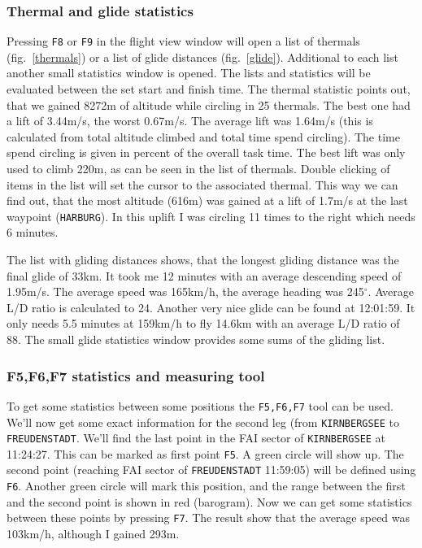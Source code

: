 \subsubsection{Thermal and glide statistics}
Pressing \texttt{F8} or \texttt{F9} in the flight view window will open a list of thermals (fig.~\ref{thermals}) or a list of glide distances (fig.~\ref{glide}).
Additional to each list another small statistics window is opened. The lists and statistics will be evaluated between the set start and finish time.
The thermal statistic points out, that we gained 8272m of altitude while circling in 25 thermals. The best one had a lift of 3.44m/s, the worst 0.67m/s.
The average lift was 1.64m/s (this is calculated from total altitude climbed and total time spend circling).
The time spend circling is given in percent of the overall task time. The best lift was only used to climb 220m, as can be seen in the list of thermals.
Double clicking of items in the list will set the cursor to the associated thermal.
This way we can find out, that the most altitude (616m) was gained at a lift of 1.7m/s at the last waypoint (\texttt{HARBURG}).
In this uplift I was circling 11 times to the right which needs 6 minutes.

The list with gliding distances shows, that the longest gliding distance was the final glide of 33km.
It took me 12 minutes with an average descending speed of 1.95m/s. The average speed was 165km/h, the average heading was 245$^\circ$.
Average L/D ratio is calculated to 24. Another very nice glide can be found at 12:01:59.
It only needs 5.5 minutes at 159km/h to fly 14.6km with an average L/D ratio of 88.
The small glide statistics window provides some sums of the gliding list.


\subsubsection{F5,F6,F7 statistics and measuring tool}
\label{f5f6f7}
To get some statistics between some positions the \texttt{F5,F6,F7} tool can be used.
We'll now get some exact information for the second leg (from \texttt{KIRNBERGSEE} to \texttt{FREUDENSTADT}.
We'll find the last point in the FAI sector of \texttt{KIRNBERGSEE} at 11:24:27. This can be marked as first point \texttt{F5}.
A green circle will show up. The second point (reaching FAI sector of \texttt{FREUDENSTADT} 11:59:05) will be defined using \texttt{F6}.
Another green circle will mark this position, and the range between the first and the second point is shown in red (barogram).
Now we can get some statistics between these points by pressing \texttt{F7}.
The result show that the average speed was 103km/h, although I gained 293m.


